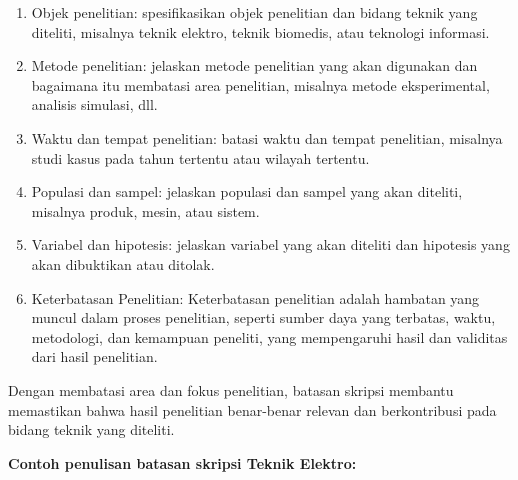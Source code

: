 \begin{enumerate}
\item Objek penelitian: spesifikasikan objek penelitian dan bidang teknik yang diteliti, misalnya teknik elektro, teknik biomedis, atau teknologi informasi.
\item Metode penelitian: jelaskan metode penelitian yang akan digunakan dan 
bagaimana itu membatasi area penelitian, misalnya metode eksperimental, 
analisis simulasi, dll.
\item Waktu dan tempat penelitian: batasi waktu dan tempat penelitian, misalnya studi kasus pada tahun tertentu atau wilayah tertentu.
\item Populasi dan sampel: jelaskan populasi dan sampel yang akan diteliti, misalnya produk, mesin, atau sistem.
\item Variabel dan hipotesis: jelaskan variabel yang akan diteliti dan hipotesis yang akan dibuktikan atau ditolak.
\item Keterbatasan Penelitian: Keterbatasan penelitian adalah hambatan yang muncul dalam proses penelitian, seperti sumber daya yang terbatas, waktu, metodologi, dan kemampuan peneliti, yang mempengaruhi hasil dan validitas dari hasil penelitian.
\end{enumerate}

Dengan membatasi area dan fokus penelitian, batasan skripsi membantu memastikan 
bahwa hasil penelitian benar-benar relevan dan berkontribusi pada bidang teknik yang diteliti.

\noindent \textbf{Contoh penulisan batasan skripsi Teknik Elektro:}

\noindent{}

